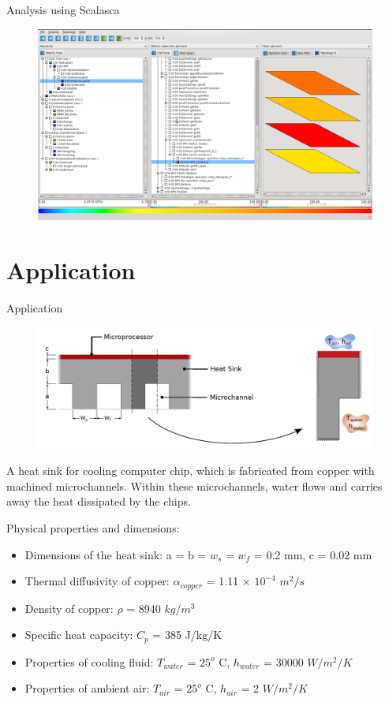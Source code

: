 \documentclass[t,english]{beamer}
\begin{document}
\begin{frame}{Analysis using Scalasca}
\begin{figure}[!htb]
\centering
\includegraphics[trim=0 0 0 50,scale=0.25]{./scalasca.png}
\end{figure}
\end{frame}

\section{Application}
\begin{frame}{Application}
\begin{figure}[!htb]
\centering
\includegraphics[scale=0.3]{./application.png}
\end{figure}
A heat sink for cooling computer chip, which is fabricated from copper with machined microchannels. Within these microchannels, water flows and carries away the heat dissipated by the chips. 
\end{frame}

\begin{frame}{Physical properties and dimensions:}
\begin{itemize}
\item Dimensions of the heat sink: 
a = b = $w_s$ = $w_f$ = 0.2 mm, c = 0.02 mm
\item Thermal diffusivity of copper: $\alpha_{copper}$ = 1.11 $\times$ $10^{-4}$ $m^2/s$
\item Density of copper: $\rho$ = 8940 $kg/m^3$
\item Specific heat capacity: $C_p$ = 385 J/kg/K
\item Properties of cooling fluid: $T_{water}$ = $25^o$ C, $h_{water}$ = 30000 $W/m^2/K$
\item Properties of ambient air: $T_{air}$ = $25^o$ C, $h_{air}$ = 2 $W/m^2/K$
\end{itemize}
\end{frame}
\end{document}

